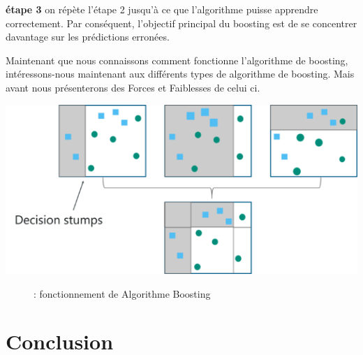 \documentclass[french,a4paper,12pt]{article}
\begin{document}
 
 \textbf{étape 3}
\quad on répète l'étape 2 jusqu'à ce que l'algorithme puisse apprendre correctement.
Par conséquent, l'objectif principal du boosting est de se concentrer davantage sur les prédictions erronées.

\quad Maintenant que nous connaissons comment fonctionne l’algorithme de boosting, intéressons-nous maintenant aux différents types de algorithme de boosting. Mais avant nous présenterons des Forces  et Faiblesses de celui ci.


\begin{center}
\includegraphics[scale=1]{fonctionnement boosting.png}
\begin{figure}[h]
\caption{: fonctionnement de Algorithme Boosting}
\end{figure}
\end{center}


























\newpage
\section{Conclusion}






\newpage
\begin{center}
\listoffigures
\end{center}

\newpage

\begin{center}


\end{center}
\end{document}
